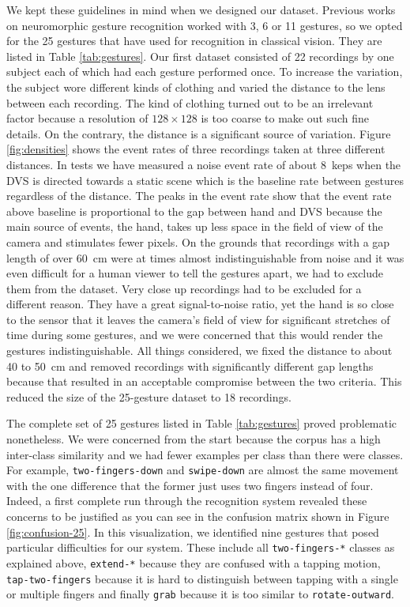 We kept these guidelines in mind when we designed our dataset. Previous works on
neuromorphic gesture recognition worked with 3, 6 or 11 gestures, so we opted
for the 25 gestures that \cite{molchanov2016online} have used for recognition in
classical vision. They are listed in Table \ref{tab:gestures}. Our first dataset
consisted of 22 recordings by one subject each of which had each gesture
performed once. To increase the variation, the subject wore different kinds of
clothing and varied the distance to the lens between each recording. The kind of
clothing turned out to be an irrelevant factor because a resolution of $128
\times 128$ is too coarse to make out such fine details. On the contrary, the
distance is a significant source of variation. Figure \ref{fig:densities} shows
the event rates of three recordings taken at three different distances. In tests
we have measured a noise event rate of about \SI{8}{keps} when the DVS is
directed towards a static scene which is the baseline rate between gestures
regardless of the distance. The peaks in the event rate show that the event rate
above baseline is proportional to the gap between hand and DVS because the main
source of events, the hand, takes up less space in the field of view of the
camera and stimulates fewer pixels. On the grounds that recordings with a gap
length of over \SI{60}{\centi\meter} were at times almost indistinguishable from
noise and it was even difficult for a human viewer to tell the gestures apart,
we had to exclude them from the dataset. Very close up recordings had to be
excluded for a different reason. They have a great signal-to-noise ratio, yet
the hand is so close to the sensor that it leaves the camera's field of view for
significant stretches of time during some gestures, and we were concerned that
this would render the gestures indistinguishable. All things considered, we
fixed the distance to about \SI{40}{} to \SI{50}{\centi\meter} and removed
recordings with significantly different gap lengths because that resulted in an
acceptable compromise between the two criteria. This reduced the size of the
25-gesture dataset to 18 recordings.

The complete set of 25 gestures listed in Table \ref{tab:gestures} proved
problematic nonetheless. We were concerned from the start because the corpus has
a high inter-class similarity and we had fewer examples per class than there
were classes. For example, \texttt{two-fingers-down} and \texttt{swipe-down} are
almost the same movement with the one difference that the former just uses two
fingers instead of four. Indeed, a first complete run through the recognition
system revealed these concerns to be justified as you can see in the confusion
matrix shown in Figure \ref{fig:confusion-25}. In this visualization, we
identified nine gestures that posed particular difficulties for our system.
These include all \texttt{two-fingers-*} classes as explained above,
\texttt{extend-*} because they are confused with a tapping motion,
\texttt{tap-two-fingers} because it is hard to distinguish between tapping with
a single or multiple fingers and finally \texttt{grab} because it is too similar
to \texttt{rotate-outward}.

